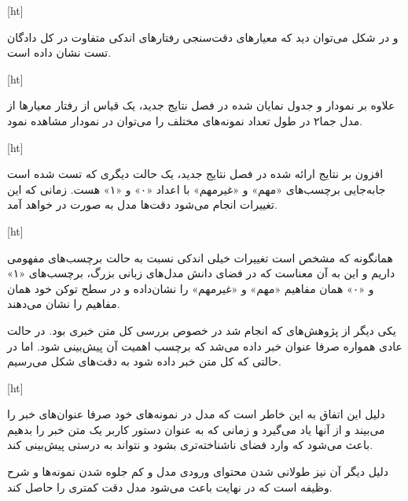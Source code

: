 [ht]

و در شکل  می‌توان دید که معیارهای دقت‌سنجی رفتارهای اندکی متفاوت در کل دادگان تست نشان داده است.


[ht]

علاوه بر نمودار و جدول نمایان شده در فصل نتایج جدید، یک قیاس از رفتار معیارها از مدل جما۲ در طول تعداد نمونه‌های مختلف را می‌توان در نمودار  مشاهده نمود.

[ht]

افزون بر نتایج ارائه شده در فصل نتایج جدید، یک حالت دیگری که تست شده است جابه‌جایی برچسب‌های «مهم» و «غیرمهم» با اعداد «۰» و «۱» هست. زمانی که این تغییرات انجام می‌شود دقت‌ها مدل به صورت  در خواهد آمد.


[ht]

همانگونه که مشخص است تغییرات خیلی اندکی نسبت به حالت برچسب‌های مفهومی داریم و این به آن معناست که در فضای دانش مدل‌های زبانی بزرگ، برچسب‌های «۱» و «۰» همان مفاهیم «مهم» و «غیرمهم» را نشان‌داده و در سطح توکن خود همان مفاهیم را نشان‌ می‌دهند.

یکی دیگر از پژوهش‌های که انجام شد در خصوص بررسی کل متن خبری بود. در حالت عادی همواره صرفا عنوان خبر داده‌ می‌شد که برچسب اهمیت آن پیش‌بینی شود. اما در حالتی که کل متن خبر داده شود به دقت‌های شکل  می‌رسیم.

[ht]

دلیل این اتفاق به این خاطر است که مدل در نمونه‌های خود صرفا عنوان‌های خبر را می‌بیند و از آنها یاد می‌گیرد و زمانی که به عنوان دستور کاربر یک متن خبر را بدهیم باعث می‌شود که وارد فضای ناشناخته‌تری بشود و نتواند به درستی پیش‌بینی کند.

دلیل دیگر آن نیز طولانی شدن محتوای ورودی مدل و کم جلوه شدن نمونه‌ها و شرح وظیفه‌ است که در نهایت باعث می‌شود مدل دقت‌ کمتری را حاصل کند.

